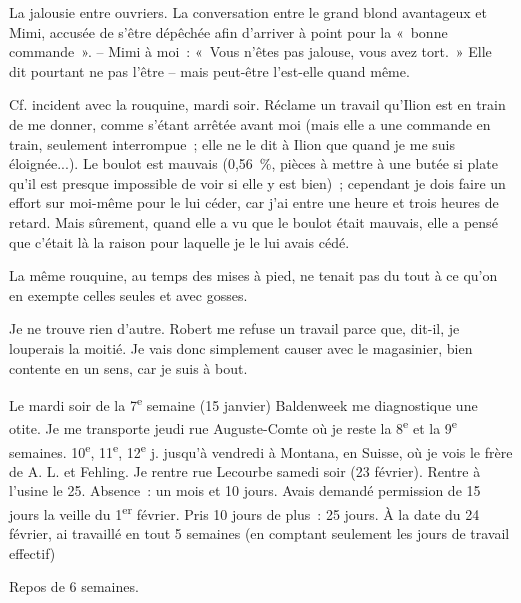 \documentclass[french,twoside]{book} %
\begin{document}
La jalousie entre ouvriers. La conversation entre le grand blond avantageux et Mimi, accusée de s'être dépêchée afin d'arriver à point pour la « bonne commande ». – Mimi à moi : « Vous n'êtes pas jalouse, vous avez tort. » Elle dit pourtant ne pas l'être – mais peut-être l'est-elle quand même.\par
Cf. incident avec la rouquine, mardi soir. Réclame un travail qu'Ilion est en train de me donner, comme s'étant arrêtée avant moi (mais elle a une commande en train, seulement interrompue ; elle ne le dit à Ilion que quand je me suis éloignée...). Le boulot est mauvais (0,56 \%, pièces à mettre à une butée si plate qu'il est presque impossible de voir si elle y est bien) ; cependant je dois faire un effort sur moi-même pour le lui céder, car j'ai entre une heure et trois heures de retard. Mais sûrement, quand elle a vu que le boulot était mauvais, elle a pensé que c'était là la raison pour laquelle je le lui avais cédé.\par
La même rouquine, au temps des mises à pied, ne tenait pas du tout à ce qu'on en exempte celles seules et avec gosses.\par
Je ne trouve rien d'autre. Robert me refuse un travail parce que, dit-il, je louperais la moitié. Je vais donc simplement causer avec le magasinier, bien contente en un sens, car je suis à bout.\par
Le mardi soir de la 7\textsuperscript{e} semaine (15 janvier) Baldenweek me diagnostique une otite. Je me transporte jeudi rue Auguste-Comte où je reste la 8\textsuperscript{e} et la 9\textsuperscript{e} semaines. 10\textsuperscript{e}, 11\textsuperscript{e}, 12\textsuperscript{e} j. jusqu'à vendredi à Montana, en Suisse, où je vois le frère de A. L. et Fehling. Je rentre rue Lecourbe samedi soir (23 février). Rentre à l'usine le 25. Absence : un mois et 10 jours. Avais demandé permission de 15 jours la veille du 1\textsuperscript{er} février. Pris 10 jours de plus : 25 jours. À la date du 24 février, ai travaillé en tout 5 semaines (en comptant seulement les jours de travail effectif)\par
Repos de 6 semaines.
\end{document}
